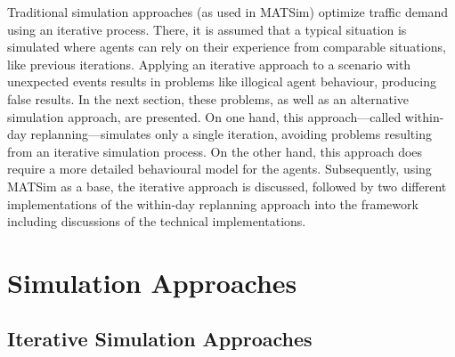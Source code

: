 Traditional simulation approaches (as used in MATSim) optimize traffic demand using an iterative process. There, it is assumed that a typical situation is simulated where agents can rely on their experience from comparable situations, like previous iterations. Applying an iterative approach to a scenario with unexpected events results in problems like illogical agent behaviour, producing false results. In the next section, these problems, as well as an alternative simulation approach, are presented. On one hand, this approach---called within-day replanning---simulates only a single iteration, avoiding problems resulting from an iterative simulation process. On the other hand, this approach does require a more detailed behavioural model for the agents. Subsequently, using MATSim as a base, the iterative approach is discussed, followed by two different implementations of the within-day replanning approach into the framework including discussions of the technical implementations.






\section{Simulation Approaches} \label{sec:SimulationApproaches}

\subsection{Iterative Simulation Approaches} \label{sec:IterativeSimulationApproaches}

